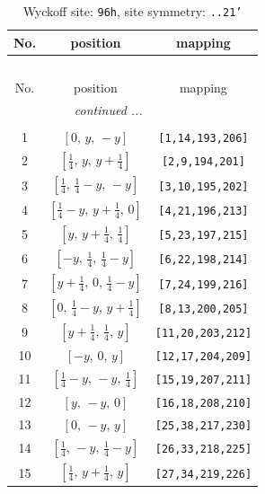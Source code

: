 \documentclass[fleqn,8pt]{jsarticle}
\begin{document}
\begin{longtable}{ccc}
\caption{Wyckoff site: {\tt 96h}, site symmetry: {\tt ..21'}}
 \\
 \hline \hline
No. & position & mapping \\ \hline \endfirsthead

\multicolumn{2}{l}{\tablename\ \thetable{}} \\
 \hline \hline
No. & position & mapping \\ \hline \endhead

 \hline \hline
\multicolumn{2}{r}{\footnotesize\it continued ...} \\ \endfoot

 \hline \hline
\multicolumn{2}{r}{} \\ \endlastfoot

1 & $\left[ 0,\, y,\, - y \right]$ & {\tt [1,14,193,206]} \\ \hline
2 & $\left[ \frac{1}{4},\, y,\, y + \frac{1}{4} \right]$ & {\tt [2,9,194,201]} \\ \hline
3 & $\left[ \frac{1}{4},\, \frac{1}{4} - y,\, - y \right]$ & {\tt [3,10,195,202]} \\ \hline
4 & $\left[ \frac{1}{4} - y,\, y + \frac{1}{4},\, 0 \right]$ & {\tt [4,21,196,213]} \\ \hline
5 & $\left[ y,\, y + \frac{1}{4},\, \frac{1}{4} \right]$ & {\tt [5,23,197,215]} \\ \hline
6 & $\left[ - y,\, \frac{1}{4},\, \frac{1}{4} - y \right]$ & {\tt [6,22,198,214]} \\ \hline
7 & $\left[ y + \frac{1}{4},\, 0,\, \frac{1}{4} - y \right]$ & {\tt [7,24,199,216]} \\ \hline
8 & $\left[ 0,\, \frac{1}{4} - y,\, y + \frac{1}{4} \right]$ & {\tt [8,13,200,205]} \\ \hline
9 & $\left[ y + \frac{1}{4},\, \frac{1}{4},\, y \right]$ & {\tt [11,20,203,212]} \\ \hline
10 & $\left[ - y,\, 0,\, y \right]$ & {\tt [12,17,204,209]} \\ \hline
11 & $\left[ \frac{1}{4} - y,\, - y,\, \frac{1}{4} \right]$ & {\tt [15,19,207,211]} \\ \hline
12 & $\left[ y,\, - y,\, 0 \right]$ & {\tt [16,18,208,210]} \\ \hline
13 & $\left[ 0,\, - y,\, y \right]$ & {\tt [25,38,217,230]} \\ \hline
14 & $\left[ \frac{1}{4},\, - y,\, \frac{1}{4} - y \right]$ & {\tt [26,33,218,225]} \\ \hline
15 & $\left[ \frac{1}{4},\, y + \frac{1}{4},\, y \right]$ & {\tt [27,34,219,226]} \\ \hline

\end{longtable}
\end{document}
